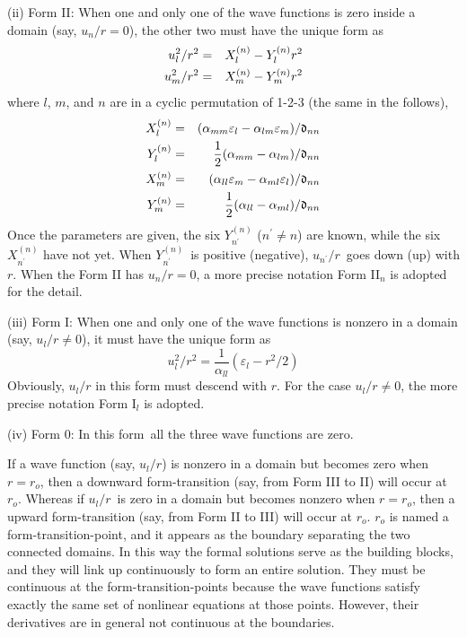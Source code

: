 \documentclass[single-column,showpacs,groupedaddress]{revtex4}
\begin{document}
(ii) Form II: When one and only one of the wave functions is zero inside a
domain (say, $u_{n}/r=0$), the other two must have the unique form as
\begin{eqnarray}
u_{l}^{2}/r^{2} &=&X_{l}^{(n)}-Y_{l}^{(n)}r^{2}  \notag \\
u_{m}^{2}/r^{2} &=&X_{m}^{(n)}-Y_{m}^{(n)}r^{2}  \label{eq8}
\end{eqnarray}%
where $l$, $m$, and $n$ are in a cyclic permutation of 1-2-3 (the same in
the follows),
\begin{eqnarray}
X_{l}^{(n)} &=&(\alpha _{mm}\varepsilon _{l}-\alpha _{lm}\varepsilon _{m})/%
\mathfrak{d}_{nn}  \notag \\
Y_{l}^{(n)} &=&\frac{1}{2}(\alpha _{mm}-\alpha _{lm})/\mathfrak{d}_{nn}
\notag \\
X_{m}^{(n)} &=&(\alpha _{ll}\varepsilon _{m}-\alpha _{ml}\varepsilon _{l})/%
\mathfrak{d}_{nn}  \notag \\
Y_{m}^{(n)} &=&\frac{1}{2}(\alpha _{ll}-\alpha _{ml})/\mathfrak{d}_{nn}
\label{eq9}
\end{eqnarray}%
Once the parameters are given, the six $Y_{n^{\prime }}^{(n)}$ ($n^{\prime
}\neq n$) are known, while the six $X_{n^{\prime }}^{(n)}$ have not yet.
When $Y_{n^{\prime }}^{(n)}$\ is positive (negative), $u_{n^{\prime }}/r$\
goes down (up) with $r$. When the Form II has $u_{n}/r=0$, a more precise
notation Form II$_{n}$ is adopted for the detail.

(iii) Form I: When one and only one of the wave functions is nonzero in a
domain (say, $u_{l}/r\neq 0$), it must have the unique form as
\begin{equation}
u_{l}^{2}/r^{2}=\frac{1}{\alpha _{ll}}(\varepsilon _{l}-r^{2}/2)
\label{eq10}
\end{equation}%
Obviously, $u_{l}/r$ in this form must descend with $r$. For the case $%
u_{l}/r\neq 0$, the more precise notation Form I$_{l}$ is adopted.

(iv) Form 0: In this form\ all the three wave functions are zero.

If a wave function (say, $u_{l}/r$) is nonzero in a domain but becomes zero
when $r=r_{o}$, then a downward form-transition (say, from Form III to II)
will occur at $r_{o}$. Whereas if $u_{l}/r$\ is zero in a domain but becomes
nonzero when $r=r_{o}$, then a upward form-transition (say, from Form II to
III) will occur at $r_{o}$. $r_{o}$ is named a form-transition-point, and it
appears as the boundary separating the two connected domains. In this way
the formal solutions serve as the building blocks, and they will link up
continuously to form an entire solution. They must be continuous at the
form-transition-points because the wave functions satisfy exactly the same
set of nonlinear equations at those points. However, their derivatives are
in general not continuous at the boundaries.
\end{document}
